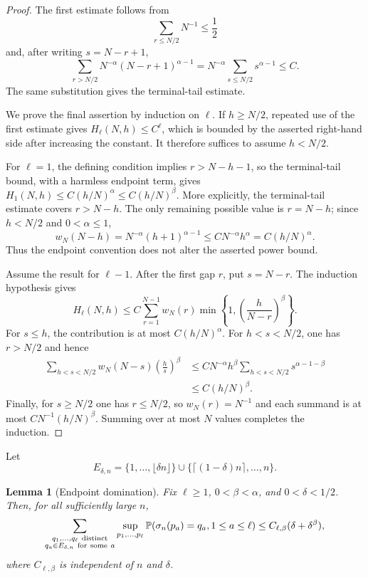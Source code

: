 \documentclass[11pt]{article}
\newtheorem{lemma}[theorem]{Lemma}
\theoremstyle{remark}
\newcommand{\Pp}{\mathbb P}
\begin{document}
\begin{proof}
The first estimate follows from
\[
 \sum_{r\le N/2}N^{-1}\le\frac12
\]
and, after writing $s=N-r+1$,
\[
 \sum_{r>N/2}N^{-\alpha}(N-r+1)^{\alpha-1}
 =N^{-\alpha}\sum_{s\le N/2}s^{\alpha-1}\le C.
\]
The same substitution gives the terminal-tail estimate.

We prove the final assertion by induction on $\ell$.  If $h\ge N/2$, repeated
use of the first estimate gives $H_\ell(N,h)\le C^\ell$, which is bounded by
the asserted right-hand side after increasing the constant.  It therefore
suffices to assume $h<N/2$.

For $\ell=1$, the defining condition implies $r>N-h-1$, so the terminal-tail
bound, with a harmless endpoint term, gives
$H_1(N,h)\le C(h/N)^\alpha\le C(h/N)^\beta$.
More explicitly, the terminal-tail estimate covers \(r>N-h\).  The only
remaining possible value is \(r=N-h\); since \(h<N/2\) and
\(0<\alpha\le1\),
\[
 w_N(N-h)=N^{-\alpha}(h+1)^{\alpha-1}
 \le C N^{-\alpha}h^\alpha
 =C(h/N)^\alpha.
\]
Thus the endpoint convention does not alter the asserted power bound.

Assume the result for $\ell-1$.  After the first gap $r$, put $s=N-r$.
The induction hypothesis gives
\[
 H_\ell(N,h)
 \le C\sum_{r=1}^{N-1}w_N(r)
 \min\left\{1,\left(\frac h{N-r}\right)^\beta\right\}.
\]
For $s\le h$, the contribution is at most $C(h/N)^\alpha$.  For
$h<s<N/2$, one has $r>N/2$ and hence
\[
\begin{aligned}
 \sum_{h<s<N/2}w_N(N-s)\left(\frac hs\right)^\beta
 &\le C N^{-\alpha}h^\beta
 \sum_{h<s<N/2}s^{\alpha-1-\beta}\\
 &\le C(h/N)^\beta.
\end{aligned}
\]
Finally, for $s\ge N/2$ one has $r\le N/2$, so $w_N(r)=N^{-1}$ and each
summand is at most $CN^{-1}(h/N)^\beta$.  Summing over at most $N$ values
completes the induction.
\end{proof}

Let
\[
        E_{\delta,n}
        =\{1,\ldots,\lfloor\delta n\rfloor\}
        \cup
        \{\lceil(1-\delta)n\rceil,\ldots,n\}.
\]

\begin{lemma}[Endpoint domination]\label{lem:endpoint-dom}
Fix \(\ell\ge1\), \(0<\beta<\alpha\), and \(0<\delta<1/2\).  Then, for all sufficiently large \(n\),
\[
\sum_{\substack{q_1,
\ldots,q_\ell\ {\rm distinct}\\
q_a\in E_{\delta,n}\ {\rm for\ some}\ a}}
\sup_{p_1,
\ldots,p_\ell}
\Pp(\sigma_n(p_a)=q_a,1\le a\le\ell)
\le C_{\ell,\beta}(\delta+\delta^\beta),
\]
where \(C_{\ell,\beta}\) is independent of \(n\) and \(\delta\).
\end{lemma}
\end{document}

